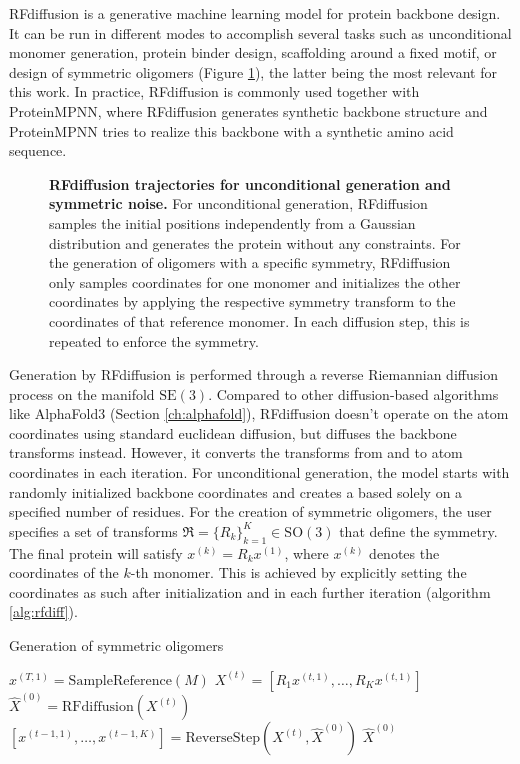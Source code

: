 RFdiffusion is a generative machine learning model for protein backbone design. It can be run in different modes to accomplish several tasks such as unconditional monomer generation, protein binder design, scaffolding around a fixed motif, or design of symmetric oligomers (Figure \ref{fig:rfdiff_trajectories}), the latter being the most relevant for this work. In practice, RFdiffusion is commonly used together with ProteinMPNN, where RFdiffusion generates synthetic backbone structure and ProteinMPNN tries to realize this backbone with a synthetic amino acid sequence. 

\begin{figure}
\centering

\caption{\textbf{RFdiffusion trajectories for unconditional generation and symmetric noise.} For unconditional generation, RFdiffusion samples the initial positions independently from a Gaussian distribution and generates the protein without any constraints. For the generation of oligomers with a specific symmetry, RFdiffusion only samples coordinates for one monomer and initializes the other coordinates by applying the respective symmetry transform to the coordinates of that reference monomer. In each diffusion step, this is repeated to enforce the symmetry. }
\label{fig:rfdiff_trajectories}
\end{figure}

Generation by RFdiffusion is performed through a reverse Riemannian diffusion process on the manifold $\mathrm{SE}(3)$. Compared to other diffusion-based algorithms like AlphaFold3 (Section \ref{ch:alphafold}), RFdiffusion doesn't operate on the atom coordinates using standard euclidean diffusion, but diffuses the backbone transforms instead. However, it converts the transforms from and to atom coordinates in each iteration. For unconditional generation, the model starts with randomly initialized backbone coordinates and creates a based solely on a specified number of residues. For the creation of symmetric oligomers, the user specifies a set of transforms $\mathfrak{R}=\{R_k\}_{k=1}^K \in \mathrm{SO}(3)$ that define the symmetry. The final protein will satisfy $x^{(k)} = R_k x^{(1)}$, where $x^{(k)}$ denotes the coordinates of the $k$-th monomer. This is achieved by explicitly setting the coordinates as such after initialization and in each further iteration (algorithm \ref{alg:rfdiff}). 

\begin{algorithm}
    \caption{Generation of symmetric oligomers}
    \begin{algorithmic}[1]
    \State $x^{(T,1)} = \text{SampleReference}(M)$
        \State $X^{(t)} = [R_1 x^{(t,1)}, \ldots, R_K x^{(t,1)}]$
        \State $\hat{X}^{(0)} = \text{RFdiffusion}(X^{(t)})$
        \State $[x^{(t-1,1)}, \ldots, x^{(t-1,K)}] = \text{ReverseStep}(X^{(t)}, \hat{X}^{(0)})$
    \EndFor
    \State \Return $\hat{X}^{(0)}$
    \end{algorithmic}
    \label{alg:rfdiff}
\end{algorithm}

